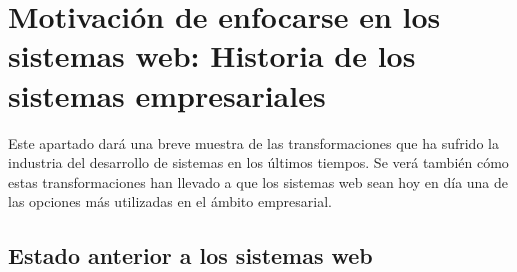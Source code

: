 \section{Motivación de enfocarse en los sistemas web: Historia de los sistemas empresariales}
\label{appendix:history}

Este apartado dará una breve muestra de las transformaciones que ha
sufrido la industria del desarrollo de sistemas en los últimos tiempos. Se verá 
también cómo estas transformaciones han llevado a que los sistemas web sean hoy 
en día una de las opciones más utilizadas en el ámbito empresarial.\\

\subsection{Estado anterior a los sistemas web}
\label{subsec:history:about_web:previous_pc}

